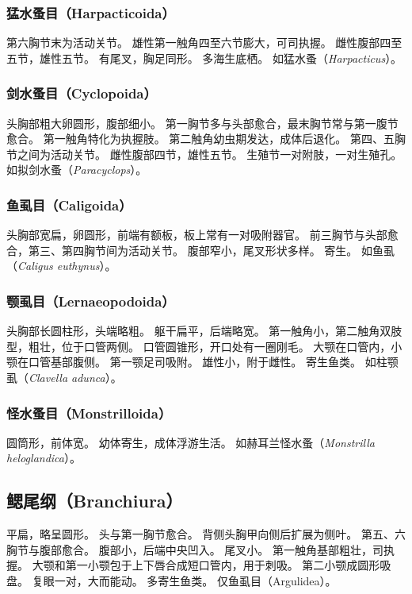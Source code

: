 \documentclass[11pt]{article}
\begin{document}
\subsubsection{猛水蚤目（Harpacticoida）}
第六胸节末为活动关节。
雄性第一触角四至六节膨大，可司执握。
雌性腹部四至五节，雄性五节。
有尾叉，胸足同形。
多海生底栖。
如猛水蚤（\textit{Harpacticus}）。

\subsubsection{剑水蚤目（Cyclopoida）}
头胸部粗大卵圆形，腹部细小。
第一胸节多与头部愈合，最末胸节常与第一腹节愈合。
第一触角特化为执握肢。
第二触角幼虫期发达，成体后退化。
第四、五胸节之间为活动关节。
雌性腹部四节，雄性五节。
生殖节一对附肢，一对生殖孔。
如拟剑水蚤（\textit{Paracyclops}）。

\subsubsection{鱼虱目（Caligoida）}
头胸部宽扁，卵圆形，前端有额板，板上常有一对吸附器官。
前三胸节与头部愈合，第三、第四胸节间为活动关节。
腹部窄小，尾叉形状多样。
寄生。
如鱼虱（\textit{Caligus euthynus}）。

\subsubsection{颚虱目（Lernaeopodoida）}
头胸部长圆柱形，头端略粗。
躯干扁平，后端略宽。
第一触角小，第二触角双肢型，粗壮，位于口管两侧。
口管圆锥形，开口处有一圈刚毛。
大颚在口管内，小颚在口管基部腹侧。
第一颚足司吸附。
雄性小，附于雌性。
寄生鱼类。
如柱颚虱（\textit{Clavella adunca}）。

\subsubsection{怪水蚤目（Monstrilloida）}
圆筒形，前体宽。
幼体寄生，成体浮游生活。
如赫耳兰怪水蚤（\textit{Monstrilla heloglandica}）。

\subsection{鳃尾纲（Branchiura）}
平扁，略呈圆形。
头与第一胸节愈合。
背侧头胸甲向侧后扩展为侧叶。
第五、六胸节与腹部愈合。
腹部小，后端中央凹入。
尾叉小。
第一触角基部粗壮，司执握。
大颚和第一小颚包于上下唇合成短口管内，用于刺吸。
第二小颚成圆形吸盘。
复眼一对，大而能动。
多寄生鱼类。
仅鱼虱目（Argulidea）。
\end{document}
